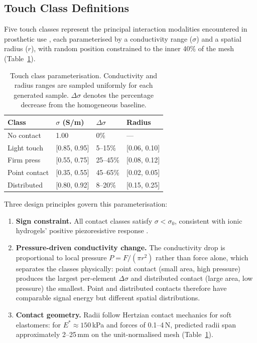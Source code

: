 \subsection{Touch Class Definitions}
\label{sec:method-classes}

Five touch classes represent the principal interaction modalities encountered in prosthetic use \parencite{park2022skin, silvera-tawil2012eit}, each parameterised by a conductivity range ($\sigma$) and a spatial radius ($r$), with random position constrained to the inner 40\% of the mesh (Table~\ref{tab:class-params}).

\begin{table}[htbp]
\centering
\caption[Touch class parameterisation]{Touch class parameterisation. Conductivity and radius ranges are sampled uniformly for each generated sample. $\Delta\sigma$ denotes the percentage decrease from the homogeneous baseline.}
\label{tab:class-params}
\small
\setlength{\tabcolsep}{8pt}
\renewcommand{\arraystretch}{1.15}
\begin{tabular}{@{}l l l l@{}}
\toprule
\textbf{Class} & \textbf{$\sigma$ (S/m)} & \textbf{$\Delta\sigma$} & \textbf{Radius} \\
\midrule
No contact   & 1.00         & 0\%      & --- \\
Light touch  & [0.85, 0.95] & 5--15\%  & [0.06, 0.10] \\
Firm press   & [0.55, 0.75] & 25--45\% & [0.08, 0.12] \\
Point contact& [0.35, 0.55] & 45--65\% & [0.02, 0.05] \\
Distributed  & [0.80, 0.92] & 8--20\%  & [0.15, 0.25] \\
\bottomrule
\end{tabular}
\end{table}

Three design principles govern this parameterisation:

\begin{enumerate}
    \item \textbf{Sign constraint.} All contact classes satisfy $\sigma < \sigma_0$, consistent with ionic hydrogels' positive piezoresistive response \parencite{costacornella2023}.

    \item \textbf{Pressure-driven conductivity change.} The conductivity drop is proportional to local pressure $P = F/(\pi r^2)$ rather than force alone, which separates the classes physically: point contact (small area, high pressure) produces the largest per-element $\Delta\sigma$ and distributed contact (large area, low pressure) the smallest. Point and distributed contacts therefore have comparable signal energy but different spatial distributions.

    \item \textbf{Contact geometry.} Radii follow Hertzian contact mechanics for soft elastomers: for $E^* \approx 150$\,kPa \parencite{kim2024} and forces of 0.1--4\,N, predicted radii span approximately 2--25\,mm on the unit-normalised mesh (Table~\ref{tab:class-params}).
\end{enumerate}

